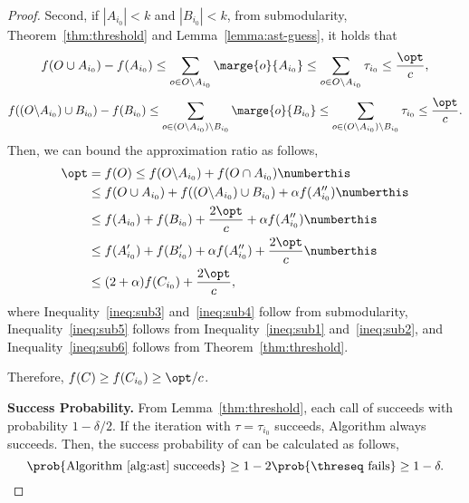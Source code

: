 \begin{proof}
    Second, if $|A_{i_0}|<k$ and $|B_{i_0}|<k$, from submodularity, 
    Theorem~\ref{thm:threshold} and Lemma~\ref{lemma:ast-guess},
    it holds that
    \begin{equation} \label{ineq:sub1}
        f(O\cup A_{i_0})-f(A_{i_0}) \le \sum_{o\in O\backslash A_{i_0}}\marge{o}{A_{i_0}} \le 
    \sum_{o\in O\backslash A_{i_0}} \tau_{i_0}\le \frac{\opt}{c},
    \end{equation}
    \begin{equation}\label{ineq:sub2}
        f((O\backslash A_{i_0})\cup B_{i_0})-f(B_{i_0})\le 
    \sum_{o\in (O\backslash A_{i_0})\backslash B_{i_0}}\marge{o}{B_{i_0}}\le 
    \sum_{o\in (O\backslash A_{i_0})\backslash B_{i_0}} \tau_{i_0}\le \frac{\opt}{c}.
    \end{equation}
    Then, we can bound the approximation ratio as follows,
    \begin{align*}
        \opt&=f(O)\le f(O \backslash A_{i_0})+ f(O\cap A_{i_0}) \numberthis \label{ineq:sub3}\\
        &\le f(O\cup A_{i_0}) + f((O\backslash A_{i_0})\cup B_{i_0})+ \alpha f(A_{i_0}'') \numberthis \label{ineq:sub4}\\
        &\le f(A_{i_0})+f(B_{i_0})+\frac{2\opt}{c}+\alpha f(A_{i_0}'') \numberthis \label{ineq:sub5}\\
        &\le f(A_{i_0}')+f(B_{i_0}')+\alpha f(A_{i_0}'')+\frac{2\opt}{c} \numberthis \label{ineq:sub6}\\
        &\le (2+\alpha)f(C_{i_0})+\frac{2\opt}{c},
    \end{align*}
    where Inequality~\ref{ineq:sub3} and~\ref{ineq:sub4} follow from submodularity, 
    Inequality~\ref{ineq:sub5} follows from Inequality~\ref{ineq:sub1} and~\ref{ineq:sub2},
    and Inequality~\ref{ineq:sub6} follows from Theorem~\ref{thm:threshold}.

    Therefore, $f(C)\ge f(C_{i_0})\ge \opt/c$.

    \textbf{Success Probability.}
    From Lemma~\ref{thm:threshold}, each call of \threseq succeeds with probability $1-\delta/2$.
    If the iteration with $\tau=\tau_{i_0}$ succeeds, Algorithm \adapst always succeeds.
    Then, the success probability of \adapst can be calculated as follows,
    $$\prob{\text{Algorithm~\ref{alg:ast} succeeds}} \ge 1-2\prob{\threseq \text{ fails}}\ge 1-\delta.$$

\end{proof}